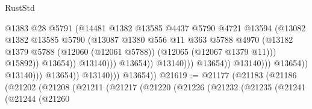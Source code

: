 \begin{lexlean}{RustStd}
\begin{coremodule}
                                                        @1383
                                                        @28
                                                        @5791
                                                        (@14481
                                                          @1382
                                                          @13585
                                                          @4437
                                                          @5790
                                                          @4721
                                                          @13594
                                                          (@13082
                                                            @1382
                                                            @13585
                                                            @5790
                                                            (@13087
                                                              @1380
                                                              @556
                                                              @11
                                                              @363
                                                              @5788
                                                              @4970
                                                              (@13182
                                                                @1379
                                                                @5788
                                                                (@12060 (@12061 @5788))
                                                                (@12065 (@12067 @1379 @11)))
                                                              @15892))
                                                          @13654))
                                                      @13140)))
                                                @13654))
                                            @13140)))
                                      @13654))
                                  @13140)))
                            @13654))
                        @13140)))
                  @13654))
              @13140)))
        @13654))
@21619 := @21177
    (@21183
      (@21186
        (@21202
          (@21208
            (@21211
              (@21217
                (@21220
                  (@21226
                    (@21232
                      (@21235
                        (@21241
                          (@21244
                            (@21260

\end{coremodule}
\end{lexlean}
